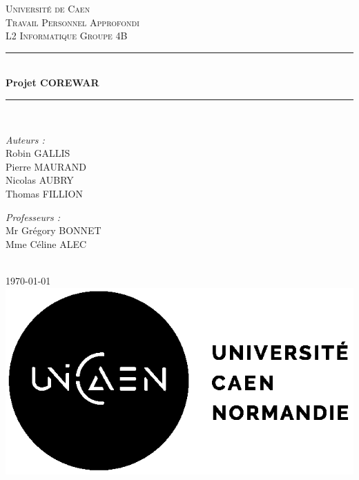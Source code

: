 \documentclass[a4paper,12pt]{article}
\begin{document}
\begin{titlepage}

\newcommand{\HRule}{\rule{\linewidth}{0.5mm}}

\center
\textsc{\LARGE Université de Caen}\\[1.5cm]
\textsc{\Large Travail Personnel Approfondi}\\[0.5cm]

\textsc{\Large L2 Informatique Groupe 4B}\\[0.5cm]

\HRule \\[0.4cm]
{ \huge \bfseries Projet COREWAR}\\[0.4cm]
\HRule \\[1.5cm]

\begin{minipage}{0.4\textwidth}
\begin{flushleft} \large
\emph{Auteurs :}\\
Robin \textsc{GALLIS}\\
Pierre \textsc{MAURAND}\\
Nicolas \textsc{AUBRY}\\
Thomas \textsc{FILLION}
\end{flushleft}
\end{minipage}
\begin{minipage}{0.4\textwidth}
\begin{flushright} \large
\emph{Professeurs :} \\
Mr Grégory\textsc{ BONNET}\\
Mme Céline\textsc{ ALEC}
\end{flushright}
\end{minipage}\\[2cm]

{\large \today}\\[2cm]
\includegraphics{logo.png}\\[1cm]
\vfill

\end{titlepage}
\tableofcontents{}
\pagebreak
\end{document}
